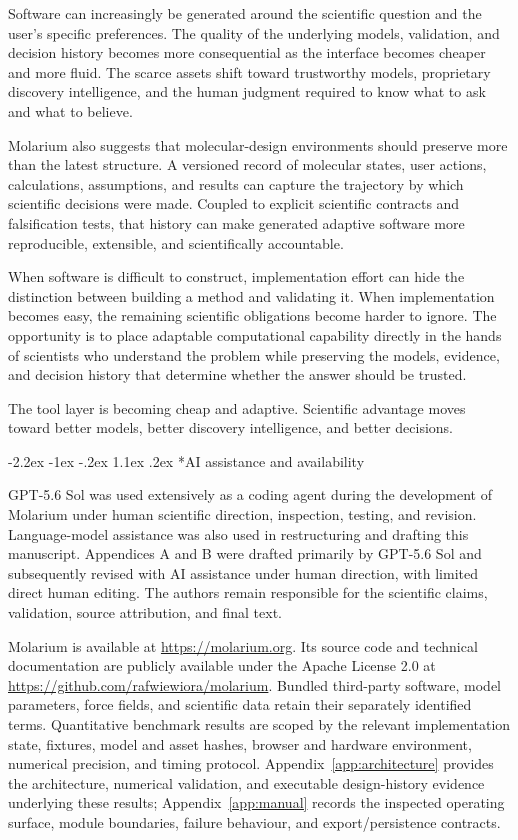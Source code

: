 \documentclass[11pt]{article}
\makeatletter
\renewcommand\section{\@startsection{section}{1}{\z@}%
  {-2.2ex \@plus -1ex \@minus -.2ex}%
  {1.1ex \@plus .2ex}%
  {\normalfont\Large\bfseries\color{molblue}}}
\makeatother
\begin{document}
Software can increasingly be generated around the scientific question and the user's specific preferences. The quality of the underlying models, validation, and decision history becomes more consequential as the interface becomes cheaper and more fluid. The scarce assets shift toward trustworthy models, proprietary discovery intelligence, and the human judgment required to know what to ask and what to believe.

Molarium also suggests that molecular-design environments should preserve more than the latest structure. A versioned record of molecular states, user actions, calculations, assumptions, and results can capture the trajectory by which scientific decisions were made. Coupled to explicit scientific contracts and falsification tests, that history can make generated adaptive software more reproducible, extensible, and scientifically accountable.

When software is difficult to construct, implementation effort can hide the distinction between building a method and validating it. When implementation becomes easy, the remaining scientific obligations become harder to ignore. The opportunity is to place adaptable computational capability directly in the hands of scientists who understand the problem while preserving the models, evidence, and decision history that determine whether the answer should be trusted.

The tool layer is becoming cheap and adaptive. Scientific advantage moves toward better models, better discovery intelligence, and better decisions.

\section*{AI assistance and availability}

GPT-5.6 Sol was used extensively as a coding agent during the development of Molarium under human scientific direction, inspection, testing, and revision. Language-model assistance was also used in restructuring and drafting this manuscript. Appendices A and B were drafted primarily by GPT-5.6 Sol and subsequently revised with AI assistance under human direction, with limited direct human editing. The authors remain responsible for the scientific claims, validation, source attribution, and final text.

Molarium is available at \url{https://molarium.org}. Its source code and technical documentation are publicly available under the Apache License 2.0 at \url{https://github.com/rafwiewiora/molarium}. Bundled third-party software, model parameters, force fields, and scientific data retain their separately identified terms. Quantitative benchmark results are scoped by the relevant implementation state, fixtures, model and asset hashes, browser and hardware environment, numerical precision, and timing protocol. Appendix~\ref{app:architecture} provides the architecture, numerical validation, and executable design-history evidence underlying these results; Appendix~\ref{app:manual} records the inspected operating surface, module boundaries, failure behaviour, and export/persistence contracts.
\end{document}
